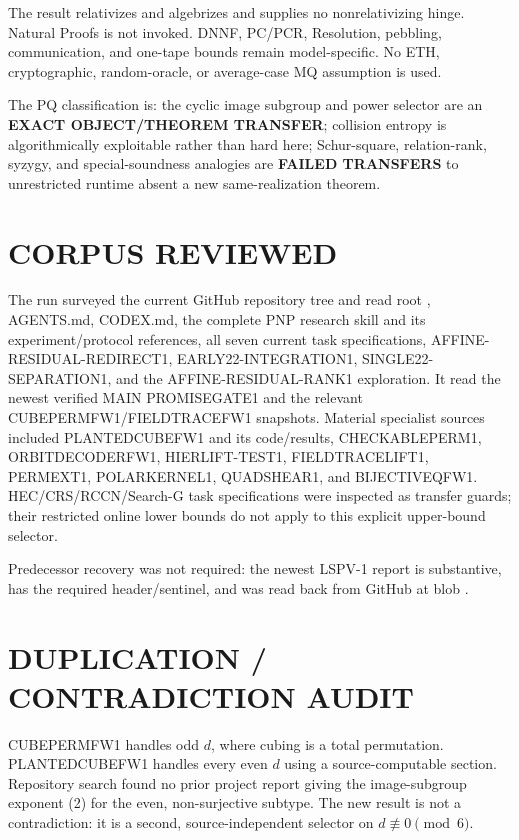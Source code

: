 \documentclass[11pt]{article}
\begin{document}
The result relativizes and algebrizes and supplies no nonrelativizing hinge.
Natural Proofs is not invoked.  DNNF, PC/PCR, Resolution, pebbling,
communication, and one-tape bounds remain model-specific.  No ETH,
cryptographic, random-oracle, or average-case MQ assumption is used.

The PQ classification is: the cyclic image subgroup and power selector are
an \textbf{EXACT OBJECT/THEOREM TRANSFER}; collision entropy is algorithmically
exploitable rather than hard here; Schur-square, relation-rank, syzygy, and
special-soundness analogies are \textbf{FAILED TRANSFERS} to unrestricted
runtime absent a new same-realization theorem.

\section{CORPUS REVIEWED}
The run surveyed the current GitHub repository tree and read root
, AGENTS.md, CODEX.md, the complete PNP research skill and its
experiment/protocol references, all seven current task specifications,
AFFINE-RESIDUAL-REDIRECT1, EARLY22-INTEGRATION1, SINGLE22-SEPARATION1, and the
AFFINE-RESIDUAL-RANK1 exploration.  It read the newest verified MAIN
PROMISEGATE1 and the relevant CUBEPERMFW1/FIELDTRACEFW1 snapshots.  Material
specialist sources included PLANTEDCUBEFW1 and its code/results,
CHECKABLEPERM1, ORBITDECODERFW1, HIERLIFT-TEST1, FIELDTRACELIFT1, PERMEXT1,
POLARKERNEL1, QUADSHEAR1, and BIJECTIVEQFW1.  HEC/CRS/RCCN/Search-G task
specifications were inspected as transfer guards; their restricted online
lower bounds do not apply to this explicit upper-bound selector.

Predecessor recovery was not required: the newest LSPV-1 report
is substantive, has the required header/sentinel, and was read back from
GitHub at blob
.

\section{DUPLICATION / CONTRADICTION AUDIT}
CUBEPERMFW1 handles odd $d$, where cubing is a total permutation.
PLANTEDCUBEFW1 handles every even $d$ using a source-computable section.
Repository search found no prior project report giving the image-subgroup
exponent (2) for the even, non-surjective subtype.  The new result is not a
contradiction: it is a second, source-independent selector on
$d\not\equiv0\pmod6$.
\end{document}
